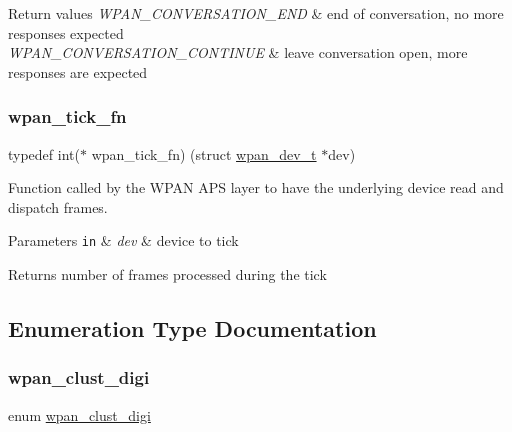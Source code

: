 \begin{DoxyRetVals}{Return values}
{\em W\+P\+A\+N\+\_\+\+C\+O\+N\+V\+E\+R\+S\+A\+T\+I\+O\+N\+\_\+\+E\+ND} & end of conversation, no more responses expected \\
\hline
{\em W\+P\+A\+N\+\_\+\+C\+O\+N\+V\+E\+R\+S\+A\+T\+I\+O\+N\+\_\+\+C\+O\+N\+T\+I\+N\+UE} & leave conversation open, more responses are expected \\
\hline
\end{DoxyRetVals}
\mbox{\label{group__wpan__aps_gafed1542f6becf2d81fd84ef2f0ae2833}} 
\subsubsection{\texorpdfstring{wpan\+\_\+tick\+\_\+fn}{wpan\_tick\_fn}}
{\footnotesize\ttfamily typedef int($\ast$ wpan\+\_\+tick\+\_\+fn) (struct \hyperlink{structwpan__dev__t}{wpan\+\_\+dev\+\_\+t} $\ast$dev)}



Function called by the W\+P\+AN A\+PS layer to have the underlying device read and dispatch frames. 


\begin{DoxyParams}[1]{Parameters}
\mbox{\tt in}  & {\em dev} & device to tick\\
\hline
\end{DoxyParams}
\begin{DoxyReturn}{Returns}
number of frames processed during the tick 
\end{DoxyReturn}


\subsection{Enumeration Type Documentation}
\mbox{\label{group__wpan__aps_ga1227ab13b41d82d9c9c9080662f74cf7}} 
\subsubsection{\texorpdfstring{wpan\+\_\+clust\+\_\+digi}{wpan\_clust\_digi}}
{\footnotesize\ttfamily enum \hyperlink{group__wpan__aps_ga1227ab13b41d82d9c9c9080662f74cf7}{wpan\+\_\+clust\+\_\+digi}}



